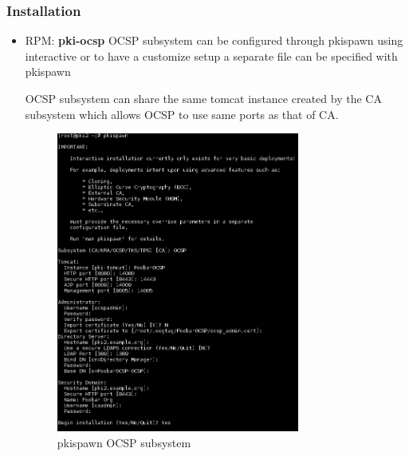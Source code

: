 \documentclass[a4paper]{article}
\begin{document}
\subsubsection{Installation}
    \begin{itemize}
        \item RPM: \textbf{pki-ocsp}
            OCSP subsystem can be configured through pkispawn using interactive or to have a customize
            setup a separate file can be specified with pkispawn

            OCSP subsystem can share the same tomcat instance created by the CA subsystem which allows
            OCSP to use same ports as that of CA.
            \begin{figure}[H]
                \centering
                \includegraphics[width=80mm]{pkispawn-ocsp.png}
                \caption{pkispawn OCSP subsystem}
            \end{figure}
    \end{itemize}
\end{document}

